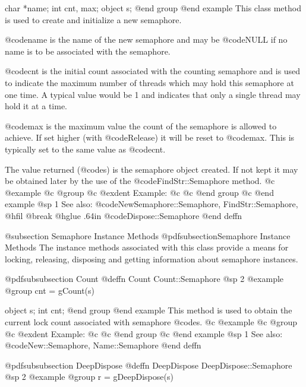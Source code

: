 char    *name;
int     cnt, max;
object  s;
@end group
@end example
This class method is used to create and initialize a new semaphore.

@code{name} is the name of the new semaphore and may be @code{NULL} if
no name is to be associated with the semaphore.

@code{cnt} is the initial count associated with the counting semaphore
and is used to indicate the maximum number of threads which may hold
this semaphore at one time.  A typical value would be 1 and indicates
that only a single thread may hold it at a time.

@code{max} is the maximum value the count of the semaphore is allowed to
achieve.  If set higher (with @code{Release}) it will be reset to
@code{max}.  This is typically set to the same value as @code{cnt}.

The value returned (@code{s}) is the semaphore object created.  If not
kept it may be obtained later by the use of the @code{FindStr::Semaphore}
method.  
@c @example
@c @group
@c @exdent Example:
@c 
@c @end group
@c @end example
@sp 1
See also:  @code{NewSemaphore::Semaphore, FindStr::Semaphore,}
@hfil @break @hglue .64in      @code{Dispose::Semaphore}
@end deffn





@subsection Semaphore Instance Methods
@pdfsubsection{Semaphore Instance Methods}
The instance methods associated with this class provide a means
for locking, releasing, disposing and getting information about
semaphore instances.












@pdfsubsubsection {Count}
@deffn {Count} Count::Semaphore
@sp 2
@example
@group
cnt = gCount(s)

object  s;
int     cnt;
@end group
@end example
This method is used to obtain the current lock count associated with
semaphore @code{s}.
@c @example
@c @group
@c @exdent Example:
@c 
@c @end group
@c @end example
@sp 1
See also:  @code{New::Semaphore, Name::Semaphore}
@end deffn









@pdfsubsubsection {DeepDispose}
@deffn {DeepDispose} DeepDispose::Semaphore
@sp 2
@example
@group
r = gDeepDispose(s)

